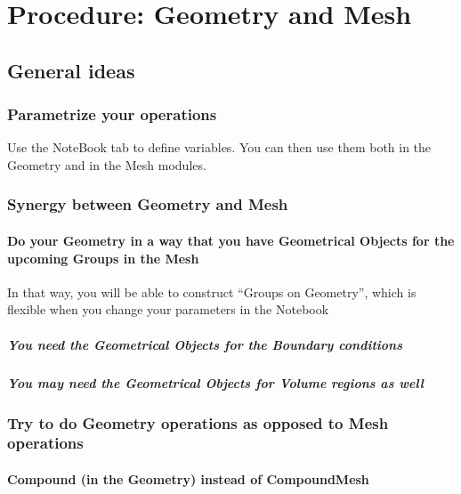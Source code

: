 \documentclass[10pt]{book}
\begin{document}
  
  
  
 \chapter{Procedure: Geometry and Mesh}

   \section{General ideas}
   
   
 \subsection{Parametrize your operations}

    Use the NoteBook tab to define variables. You can then use them both in the Geometry and in the Mesh modules.

 \subsection{Synergy between Geometry and Mesh}
 
 
 \subsubsection{Do your Geometry in a way that you have Geometrical Objects for the upcoming Groups in the Mesh}
 
  In that way, you will be able to construct ``Groups on Geometry'', which is flexible when you change your parameters in the Notebook
  
  \paragraph{You need the Geometrical Objects for the Boundary conditions}
 
  \paragraph{You may need the Geometrical Objects for Volume regions as well}
  
  
  
  \subsection{Try to do Geometry operations as opposed to Mesh operations}
 
 
  \subsubsection{Compound (in the Geometry) instead of CompoundMesh}
 
\end{document}
